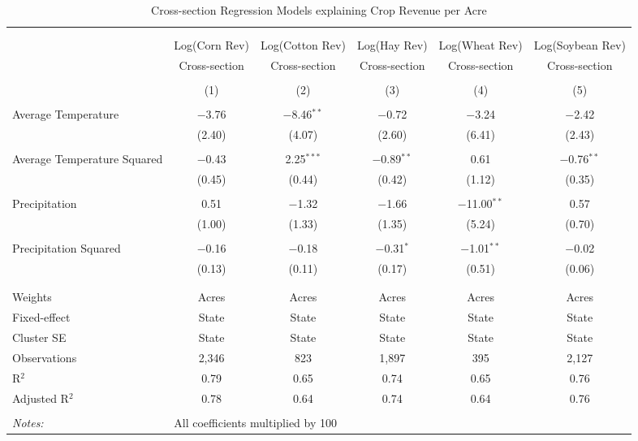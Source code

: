 \documentclass[10pt]{article}
\begin{document}
\begin{table}[!htbp] \centering 
  \caption{Cross-section Regression Models explaining Crop Revenue per Acre} 
  \label{} 
\footnotesize 
\begin{tabular}{@{\extracolsep{5pt}}lccccc} 
\\[-1.8ex]\hline 
\hline \\[-1.8ex] 
\\[-1.8ex] & Log(Corn Rev) & Log(Cotton Rev) & Log(Hay Rev) & Log(Wheat Rev) & Log(Soybean Rev) \\ 
 & Cross-section & Cross-section & Cross-section & Cross-section & Cross-section \\ 
\\[-1.8ex] & (1) & (2) & (3) & (4) & (5)\\ 
\hline \\[-1.8ex] 
 Average Temperature & $-$3.76 & $-$8.46$^{**}$ & $-$0.72 & $-$3.24 & $-$2.42 \\ 
  & (2.40) & (4.07) & (2.60) & (6.41) & (2.43) \\ 
  & & & & & \\ 
 Average Temperature Squared & $-$0.43 & 2.25$^{***}$ & $-$0.89$^{**}$ & 0.61 & $-$0.76$^{**}$ \\ 
  & (0.45) & (0.44) & (0.42) & (1.12) & (0.35) \\ 
  & & & & & \\ 
 Precipitation & 0.51 & $-$1.32 & $-$1.66 & $-$11.00$^{**}$ & 0.57 \\ 
  & (1.00) & (1.33) & (1.35) & (5.24) & (0.70) \\ 
  & & & & & \\ 
 Precipitation Squared & $-$0.16 & $-$0.18 & $-$0.31$^{*}$ & $-$1.01$^{**}$ & $-$0.02 \\ 
  & (0.13) & (0.11) & (0.17) & (0.51) & (0.06) \\ 
  & & & & & \\ 
\hline \\[-1.8ex] 
Weights & Acres & Acres & Acres & Acres & Acres \\ 
Fixed-effect & State & State & State & State & State \\ 
Cluster SE & State & State & State & State & State \\ 
Observations & 2,346 & 823 & 1,897 & 395 & 2,127 \\ 
R$^{2}$ & 0.79 & 0.65 & 0.74 & 0.65 & 0.76 \\ 
Adjusted R$^{2}$ & 0.78 & 0.64 & 0.74 & 0.64 & 0.76 \\ 
\hline 
\hline \\[-1.8ex] 
\textit{Notes:} & \multicolumn{5}{l}{All coefficients multiplied by 100} \\ 
\end{tabular} 
\end{table} 
\end{document}
